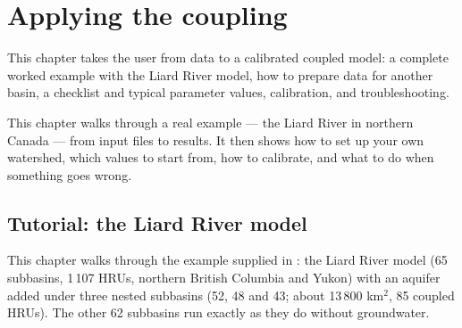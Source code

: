 \chapter{Applying the coupling}\label{ch:c7}
This chapter takes the user from data to a calibrated coupled model: a complete worked example with the Liard River model,
how to prepare data for another basin, a checklist and typical parameter values, calibration, and troubleshooting.

\begin{plain}
This chapter walks through a real example --- the Liard River in northern Canada --- from input files to results. It then
shows how to set up your own watershed, which values to start from, how to calibrate, and what to do when something goes
wrong.
\end{plain}

\section{Tutorial: the Liard River model}\label{ch:tutorial}
This chapter walks through the example supplied in : the Liard River model (65 subbasins,
1\,107 HRUs, northern British Columbia and Yukon) with an aquifer added under three nested subbasins (52, 48 and 43;
about 13\,800 km$^2$, 85 coupled HRUs). The other 62 subbasins run exactly as they do without groundwater.

